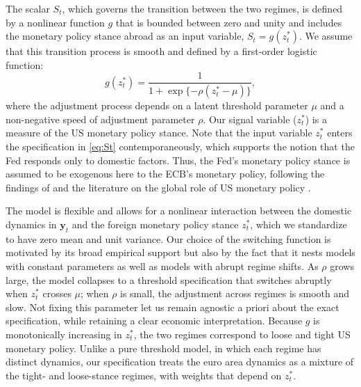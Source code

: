 The scalar $S_t$, which governs the transition between the two regimes, is defined by a nonlinear function $g$ that is bounded between zero and unity and includes the monetary policy stance abroad as an input variable, $S_t = g(z^{\ast}_{t})$. We assume that this transition process is smooth and defined by a first-order logistic function: 
\begin{equation}\label{eq:St}
g(z^{\ast}_{t}) = \frac{1}{1+\exp\{-\rho (z^{\ast}_{t} - \mu)\}},   
\end{equation}
where the adjustment process depends on a latent threshold parameter $\mu$ and a non-negative speed of adjustment parameter $\rho$. Our signal variable ($z^{\ast}_t$) is a measure of the US monetary policy stance.  Note that the input variable $z^{\ast}_{t}$ enters the specification in \autoref{eq:St} contemporaneously, which supports the notion that the Fed responds only to domestic factors. Thus, the Fed's monetary policy stance is assumed to be exogenous here to the ECB's monetary policy, following the findings of \cite{ca2021making} and the literature on the global role of US monetary policy \citep{miranda2020us}.

The model is flexible and allows for a nonlinear interaction between the domestic dynamics in $\bm y_t$ and the foreign monetary policy stance $z_t^\ast$, which we standardize to have zero mean and unit variance. Our choice of the switching function is motivated by its broad empirical support \citep[see, e.g.,][]{terasvirta1994specification} but also by the fact that it nests models with constant parameters as well as models with abrupt regime shifts. As $\rho$ grows large, the model collapses to a threshold specification that switches abruptly when $z_t^\ast$ crosses $\mu$; when $\rho$ is small, the adjustment across regimes is smooth and slow. Not fixing this parameter let us remain agnostic a priori about the exact specification, while retaining a clear economic interpretation. Because $g$ is monotonically increasing in $z_t^\ast$, the two regimes correspond to loose and tight US monetary policy. Unlike a pure threshold model, in which each regime has distinct dynamics, our specification treats the euro area dynamics as a mixture of the tight- and loose-stance regimes, with weights that depend on $z_t^\ast$.

